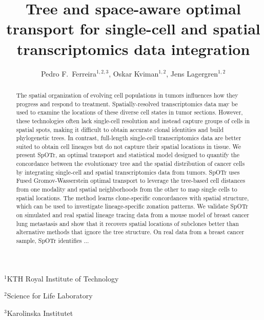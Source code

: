 \documentclass{article}
\title{Tree and space-aware optimal transport for single-cell and spatial transcriptomics data integration}
\author{
  Pedro F.~Ferreira$^{1,2,3}$,\; Oskar Kviman$^{1,2}$,\; Jens Lagergren$^{1,2}$
}
\date{}
\date{\vspace{-5ex}}
\newcommand{\toolname}{SpOTr}
\newcommand{\toolnamex}{SpOTr }
\begin{document}
\maketitle

\begin{affiliations}
 \item $^1$KTH Royal Institute of Technology
 \item $^2$Science for Life Laboratory
 \item $^3$Karolinska Institutet
\end{affiliations}

\vspace{.5cm}

\begin{abstract}
The spatial organization of evolving cell populations in tumors influences how they progress and respond to treatment. Spatially-resolved transcriptomics data may be used to examine the locations of these diverse cell states in tumor sections. However, these technologies often lack single-cell resolution and instead capture groups of cells in spatial spots, making it difficult to obtain accurate clonal identities and build phylogenetic trees. In contrast, full-length single-cell transcriptomics data are better suited to obtain cell lineages but do not capture their spatial locations in tissue. We present \toolname, an optimal transport and statistical model designed to quantify the concordance between the evolutionary tree and the spatial distribution of cancer cells by integrating single-cell and spatial transcriptomics data from tumors. \toolnamex uses Fused Gromov-Wasserstein optimal transport to leverage the tree-based cell distances from one modality and spatial neighborhoods from the other to map single cells to spatial locations. The method learns clone-specific concordances with spatial structure, which can be used to investigate lineage-specific zonation patterns. We validate \toolnamex on simulated and real spatial lineage tracing data from a mouse model of breast cancer lung metastasis and show that it recovers spatial locations of subclones better than alternative methods that ignore the tree structure. On real data from a breast cancer sample, \toolnamex identifies ...
\end{abstract}
\end{document}
